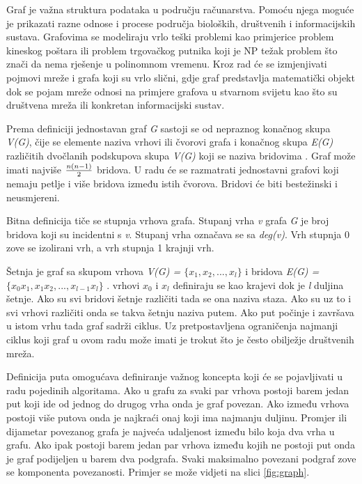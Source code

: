 Graf je važna struktura podataka u području računarstva. Pomoću njega moguće je prikazati razne odnose i procese područja bioloških, društvenih i informacijskih sustava. Grafovima se modeliraju vrlo teški problemi kao primjerice problem kineskog poštara ili problem trgovačkog putnika koji je NP težak problem što znači da nema rješenje u polinomnom vremenu. Kroz rad će se izmjenjivati pojmovi mreže i grafa koji su vrlo slični, gdje graf predstavlja matematički objekt dok se pojam mreže odnosi na primjere grafova u stvarnom svijetu kao što su društvena mreža ili konkretan informacijski sustav.

Prema definiciji jednostavan graf \textit{G} sastoji se od nepraznog konačnog skupa \textit{V(G)}, čije se elemente naziva vrhovi ili čvorovi grafa i konačnog skupa \textit{E(G)} različitih dvočlanih podskupova skupa \textit{V(G)} koji se naziva bridovima \cite{nakic_pavcevic_2019}. Graf može imati najviše $ {n(n-1) \over 2} $ bridova. U radu će se razmatrati jednostavni grafovi koji nemaju petlje i više bridova između istih čvorova. Bridovi će biti bestežinski i neusmjereni. 

Bitna definicija tiče se stupnja vrhova grafa. Stupanj vrha \textit{v} grafa \textit{G} je broj bridova koji su incidentni s \textit{v}. Stupanj vrha označava se sa \textit{deg(v)}. Vrh stupnja 0 zove se izolirani vrh, a vrh stupnja 1 krajnji vrh. \cite{nakic_pavcevic_2019}

Šetnja je graf sa skupom vrhova \textit{V(G) = $ \{x_{1},x_{2},...,x_{l}\} $ } i bridova \textit{E(G) = $ \{x_{0}x_{1},x_{1}x_{2},...,x_{l-1}x_{l}\} $ }. vrhovi $ x_{0} $ i $ x_{l} $ definiraju se kao krajevi dok je \textit{l} duljina šetnje. Ako su svi bridovi šetnje različiti tada se ona naziva staza. Ako su uz to i svi vrhovi različiti onda se takva šetnju naziva putem. Ako put počinje i završava u istom vrhu tada graf sadrži ciklus. Uz pretpostavljena ograničenja najmanji ciklus koji graf u ovom radu može imati je trokut što je često obilježje društvenih mreža.

Definicija puta omogućava definiranje važnog koncepta koji će se pojavljivati u radu pojedinih algoritama. Ako u grafu za svaki par vrhova postoji barem jedan put koji ide od jednog do drugog vrha onda je graf povezan. Ako između vrhova postoji više putova onda je najkraći onaj koji ima najmanju duljinu. Promjer ili dijametar povezanog grafa je najveća udaljenost između bilo koja dva vrha u grafu. Ako ipak postoji barem jedan par vrhova između kojih ne postoji put onda je graf podijeljen u barem dva podgrafa. Svaki maksimalno povezani podgraf zove se komponenta povezanosti. Primjer se može vidjeti na slici \ref{fig:graph}.

